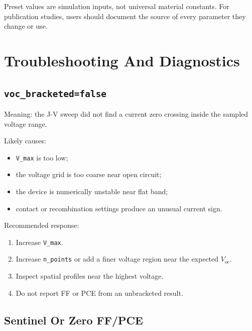 \documentclass[
  11pt,
  american,
]{report}
\providecommand{\tightlist}{%
  \setlength{\itemsep}{0pt}\setlength{\parskip}{0pt}}
\begin{document}
Preset values are simulation inputs, not universal material constants.
For publication studies, users should document the source of every
parameter they change or use.

\hypertarget{troubleshooting-and-diagnostics}{%
\chapter{Troubleshooting And
Diagnostics}\label{troubleshooting-and-diagnostics}}

\hypertarget{voc_bracketedfalse}{%
\section{\texorpdfstring{\texttt{voc\_bracketed=false}}{voc\_bracketed=false}}\label{voc_bracketedfalse}}

Meaning: the J-V sweep did not find a current zero crossing inside the
sampled voltage range.

Likely causes:

\begin{itemize}
\tightlist
\item
  \texttt{V\_max} is too low;
\item
  the voltage grid is too coarse near open circuit;
\item
  the device is numerically unstable near flat band;
\item
  contact or recombination settings produce an unusual current sign.
\end{itemize}

Recommended response:

\begin{enumerate}
\def\labelenumi{\arabic{enumi}.}
\tightlist
\item
  Increase \texttt{V\_max}.
\item
  Increase \texttt{n\_points} or add a finer voltage region near the
  expected \(V_\mathrm{oc}\).
\item
  Inspect spatial profiles near the highest voltage.
\item
  Do not report FF or PCE from an unbracketed result.
\end{enumerate}

\hypertarget{sentinel-or-zero-ffpce}{%
\section{Sentinel Or Zero FF/PCE}\label{sentinel-or-zero-ffpce}}
\end{document}
